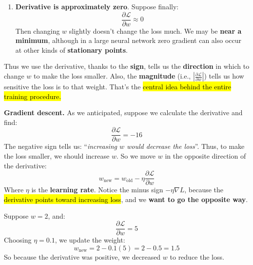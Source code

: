 \begin{remarkbox}
\begin{enumerate}
        \item \textbf{Derivative is approximately zero}. Suppose finally:
            \begin{equation*}
                \frac{\partial\mathcal{L}}{\partial w} \approx 0
            \end{equation*}
            Then changing $w$ slightly doesn't change the loss much. We may be \textbf{near a minimum}, although in a large neural network zero gradient can also occur at other kinds of \textbf{stationary points}.
    \end{enumerate}
    Thus we use the derivative, thanks to the \textbf{sign}, tells us the \textbf{direction} in which to change $w$ to make the loss smaller. Also, the \textbf{magnitude} (i.e., $\left|\frac{\partial \mathcal{L}}{\partial w}\right|$) tells us how sensitive the loss is to that weight. That's the \hl{central idea behind the entire training procedure.}

    \highspace
    \textcolor{Green3}{ \textbf{Gradient descent.}} As we anticipated, suppose we calculate the derivative and find:
    \begin{equation*}
        \frac{\partial\mathcal{L}}{\partial w} = -16
    \end{equation*}
    The negative sign tells us: ``\emph{increasing $w$ would decrease the loss}''. Thus, to make the loss smaller, we should increase $w$. So we move $w$ in the opposite direction of the derivative:
    \begin{equation*}
        w_{\text{new}} = w_{\text{old}} - \eta \frac{\partial\mathcal{L}}{\partial w}
    \end{equation*}
    Where $\eta$ is the \textbf{learning rate}. Notice the minus sign $-\eta\nabla L$, because the \hl{derivative points toward increasing loss}, and we \textbf{want to go the opposite way}.

    \begin{examplebox}
        Suppose $w=2$, and:
        \begin{equation*}
            \frac{\partial\mathcal{L}}{\partial w} = 5
        \end{equation*}
        Choosing $\eta=0.1$, we update the weight:
        \begin{equation*}
            w_{\text{new}} = 2 - 0.1(5) = 2 - 0.5 = 1.5
        \end{equation*}
        So because the derivative was positive, we decreased $w$ to reduce the loss.
    \end{examplebox}


\end{remarkbox}
